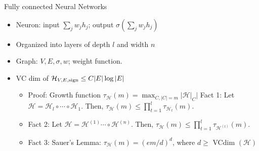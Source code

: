 \documentclass[final]{beamer}
\begin{document}
\begin{frame}{Fully connected Neural Networks}
	\begin{itemize}
		\item Neuron: input $\sum_j w_j h_j$; output $\sigma(\sum_j w_j h_j)$
		\item Organized into layers of depth $l$ and width $n$
		
		\item Graph: $V, E, \sigma, w$; weight function.
		\pause
	\item VC dim of $\mathcal{H}_{V, E, {\rm sign}} \leq C |E|\log |E|$
		\pause
		\begin{itemize}
		\item Proof: Growth function $\tau_{\mathcal{H}}(m) = \max_{C, |C|=m} |\mathcal{H}|_C| $
			\pause Fact 1: Let $\mathcal{H} =\mathcal{H}_l \circ \cdots \circ \mathcal{H}_1.$ Then,  $\tau_{\mathcal{H}}(m) \leq \prod_{t=1}^l \tau_{\mathcal{H}_t}(m)$.
			\pause 
			\item
			Fact 2: Let $\mathcal{H} =\mathcal{H}^{(1)}  \cdots \circ \mathcal{H}^{(n)}.$ Then,  $\tau_{\mathcal{H}}(m) \leq \prod_{t=1}^l \tau_{\mathcal{H}^{(t)}}(m)$.
			\pause 
		\item Fact 3: Sauer's Lemma: $\tau_{\mathcal{H}}(m) = (em/d)^d$, where $d \geq $ VCdim $(\mathcal{H})$ 
		\end{itemize}
	\end{itemize}

\end{frame}
\end{document}
